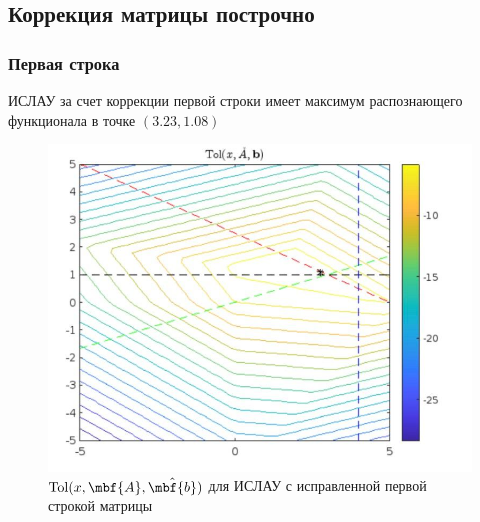 \documentclass[12pt,a4paper]{article}
\begin{document}
    \subsection{Коррекция матрицы построчно}
        \subsubsection{Первая строка}
            ИСЛАУ за счет коррекции первой строки имеет максимум распознающего функционала в точке $(3.23, 1.08)$
            \begin{figure}[H]
                \centering
                \includegraphics[width=16cm]{tol_first.png}
                \caption{$\mathrm{Tol}(x,\mbf{A}, \hat{\mbf{b}})$ для ИСЛАУ с исправленной первой строкой матрицы}
                \label{fig:aiverve}
            \end{figure}
            
\end{document}
